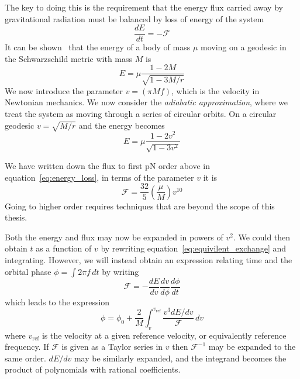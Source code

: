 The key to doing this is the requirement that the energy flux carried
away by gravitational radiation must be balanced by loss of energy of the
system
%
\begin{equation}
\label{eq:equivilent_exchange}
\frac{dE}{dt} = - \mathcal{F}
\end{equation}
%
It can be shown~\cite{MTW} that the energy of a body of mass $\mu$ moving
on a geodesic in the Schwarzschild metric with mass $M$ is
%
\begin{equation}
\label{eq:hamiltonian}
E = \mu \frac{1-2M}{\sqrt{1-3M/r}} 
\end{equation}
%
We now introduce the parameter $v = (\pi M f)$, which is the velocity
in Newtonian mechanics.  We now consider the \emph{adiabatic
approximation}, where we treat the system as moving through a series
of circular orbits.  On a circular geodesic $v= \sqrt{M/r}$ and the
energy becomes
%
\begin{equation}
E = \mu \frac{1-2v^2}{\sqrt{1-3v^2}} 
\end{equation}

We have written down the flux to first pN order above in
equation~\ref{eq:energy_loss}, in terms of the parameter $v$ it is
%
\begin{equation}
\mathcal{F} = \frac{32}{5} \left( \frac{\mu}{M} \right) v^{10}
\end{equation}
%
Going to higher order requires techniques that are beyond the scope of
this thesis.

Both the energy and flux may now be expanded in powers of $v^2$.  We
could then obtain $t$ as a function of $v$ by rewriting
equation~\ref{eq:equivilent_exchange} and integrating.  However, we
will instead obtain an expression relating time and the orbital phase
$\phi = \int 2\pi f\, dt$ by writing
%
\begin{equation*}
\mathcal{F} = - \frac{dE}{dv} \frac{dv}{d\phi} \frac{d\phi}{dt}
\end{equation*}
%
which leads to the expression
%
\begin{equation}
\label{eq:expansion_for_phi}
\phi = \phi_0 + \frac{2}{M} \int_v^{v_\mathrm{ref}} \frac{v^3
dE/dv}{\mathcal{F}}\, dv
\end{equation}
%
where $v_\mathrm{ref}$ is the velocity at a given reference velocity,
or equivalently reference frequency.  If $\mathcal{F}$ is given as a
Taylor series in $v$ then $\mathcal{F}^{-1}$ may be expanded to the
same order.  $dE/dv$ may be similarly expanded, and the integrand
becomes the product of polynomials with rational coefficients.

